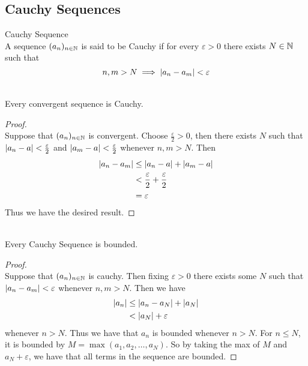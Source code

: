 \documentclass[a4paper]{article}
\begin{document}
\subsection{Cauchy Sequences}
\begin{defn}{Cauchy Sequence}{}\\ A sequence $(a_n)_{n\in\mathbb{N}}$ is said to be Cauchy if for every $\varepsilon>0$ there exists $N\in\mathbb{N}$ such that $$n,m>N\implies\abs{a_n-a_m}<\varepsilon$$
\end{defn}

\begin{prp}{}{}\\ Every convergent sequence is Cauchy. 
\begin{proof}\\ Suppose that $(a_n)_{n\in\mathbb{N}}$ is convergent. Choose $\frac{\varepsilon}{2}>0$, then there exists $N$ such that $\abs{a_n-a}<\frac{\varepsilon}{2}$ and $\abs{a_m-a}<\frac{\varepsilon}{2}$ whenever $n,m>N$. Then 
\begin{align*}
\abs{a_n-a_m}&\leq\abs{a_n-a}+\abs{a_m-a} \\
&<\frac{\varepsilon}{2}+\frac{\varepsilon}{2} \\
&=\varepsilon
\end{align*}
Thus we have the desired result. 
\end{proof}
\end{prp}

\begin{prp}{}{}\\ Every Cauchy Sequence is bounded. 
\begin{proof}\\ Suppose that $(a_n)_{n\in\mathbb{N}}$ is cauchy. Then fixing $\varepsilon>0$ there exists some $N$ such that $\abs{a_n-a_m}<\varepsilon$ whenever $n,m>N$. Then we have
\begin{align*}
\abs{a_n}&\leq\abs{a_n-a_N}+\abs{a_N}\\
&<\abs{a_N}+\varepsilon
\end{align*}
whenever $n>N$. Thus we have that $a_n$ is bounded whenever $n>N$. For $n\leq N$, it is bounded by $M=\max{(a_1,a_2,\dots,a_N)}$. So by taking the max of $M$ and $a_N+\varepsilon$, we have that all terms in the sequence are bounded. 
\end{proof}
\end{prp}
\end{document}
